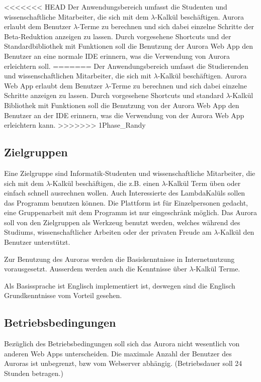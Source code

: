 \documentclass[parskip=full,11pt,twoside]{scrartcl}
\begin{document}
<<<<<<< HEAD
Der Anwendungsbereich umfasst die Studenten und wissenschaftliche Mitarbeiter, die sich mit dem $\lambda$-Kalkül beschäftigen. Aurora erlaubt dem Benutzer $\lambda$-Terme zu berechnen und sich dabei einzelne Schritte der Beta-Reduktion anzeigen zu lassen. Durch vorgesehene Shortcuts und der Standardbibliothek mit Funktionen soll die Benutzung  der Aurora Web App den Benutzer an eine normale IDE erinnern, was die Verwendung von Aurora erleichtern soll.
=======
Der Anwendungsbereich umfasst die Studierenden und wissenschaftlichen Mitarbeiter, die sich mit $\lambda$-Kalkül beschäftigen. Aurora Web App erlaubt dem Benutzer $\lambda$-Terme zu berechnen und sich dabei einzelne Schritte anzeigen zu lassen. Durch vorgesehene Shortcuts und standard $\lambda$-Kalkül Bibliothek mit Funktionen soll die Benutzung von der Aurora Web App den Benutzer an der IDE erinnern, was die Verwendung von der Aurora Web App erleichtern kann.
>>>>>>> 1Phase_Randy

\subsection{Zielgruppen}

Eine Zielgruppe sind Informatik-Studenten und wissenschaftliche Mitarbeiter, die sich mit dem $\lambda$-Kalkül beschäftigen, die z.B. einen $\lambda$-Kalkül Term  üben oder einfach schnell ausrechnen wollen. Auch Interessierte des LambdaKalüls sollen das Programm benutzen können. Die Plattform ist für Einzelpersonen gedacht, eine Gruppenarbeit mit dem Programm ist nur eingeschränk möglich. Das Aurora soll von den Zielgruppen als Werkzeug benutzt werden, welches während des Studiums, wissenschaftlicher Arbeiten oder der privaten Freude am $\lambda$-Kalkül den Benutzer unterstützt.

Zur Benutzung des Auroras werden die Basiskenntnisse in Internetnutzung vorausgesetzt. Ausserdem werden auch die Kenntnisse über $\lambda$-Kalkül Terme.

Als Basissprache ist Englisch implementiert ist, deswegen sind die Englisch Grundkenntnisse vom Vorteil gesehen.

\subsection{Betriebsbedingungen}
Bezüglich des Betriebsbedingungen soll sich das Aurora nicht wesentlich von anderen Web Apps unterscheiden. Die maximale Anzahl der Benutzer des Auroras ist unbegrenzt, bzw vom Webserver abhängig. (Betriebsdauer soll 24 Stunden betragen.) 
\end{document}
